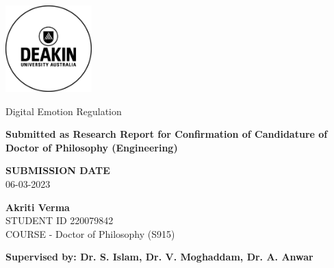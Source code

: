 \documentclass[12pt]{article}
\begin{document}
\onehalfspacing
\justifying
\thispagestyle{empty} 
\begin{titlepage}
    \includegraphics[width=0.25\textwidth]{Deakin_Logo.jpeg}
    \begin{center}
       \vspace*{4cm}
       {\LARGE Digital Emotion Regulation} %
       \vspace{3cm}
    \begin{large}   
    
        
        {\bf Submitted as Research Report for Confirmation of Candidature of Doctor of Philosophy (Engineering)}
       \vspace{1cm}
        
        {\bf SUBMISSION DATE} \\
        06-03-2023        
        
       \vspace{3cm}
       \textbf{Akriti Verma}\\
       STUDENT ID 220079842 \\
       COURSE - Doctor of Philosophy (S915)
       \vfill

       {\bf \normalsize Supervised by: Dr. S. Islam, Dr. V. Moghaddam, Dr. A. Anwar}\\
       
    \end{large}  
   \end{center}
\end{titlepage}

\newpage 
\thispagestyle{plain} 


\newpage
\begin{singlespacing}
\tableofcontents
\end{singlespacing}
\setlength{\parskip}{1em}
\renewcommand{\baselinestretch}{2.0}

\newpage
\listoffigures
\listoftables

\newpage 
{}
\setcounter{page}{1}
\onehalfspacing










\newpage
\singlespacing
\typeout{}

\end{document}
